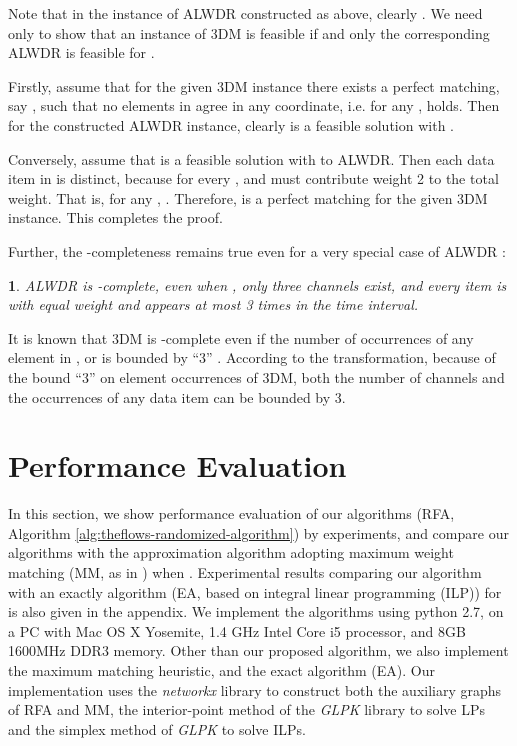 \documentclass[11pt,english,onecolumn,draftcls]{IEEEtran}
\theoremstyle{plain}
\theoremstyle{plain}
\theoremstyle{plain}
\theoremstyle{plain}
\newtheorem{cor}[thm]{\protect\corollaryname}
\providecommand{\corollaryname}{Corollary}
\begin{document}
\begin{IEEEproof}
Note that in the instance of ALWDR constructed as
above, clearly . We need only to show that an instance
of 3DM is feasible if and only the corresponding ALWDR
is feasible for .

Firstly, assume that for the given 3DM instance there exists a perfect
matching, say ,
such that no elements in  agree in any coordinate, i.e. for any
, 
holds. Then for the constructed ALWDR instance,
clearly 
is a feasible solution with .

Conversely, assume that 
is a feasible solution with  to ALWDR.
Then each data item in  is distinct, because for every ,
 and  must contribute weight 2 to the total weight.
That is, for any , .
Therefore, 
is a perfect matching for the given 3DM instance. This completes the
proof.
\end{IEEEproof}
Further, the -completeness remains true even for a very
special case of ALWDR :
\begin{cor}
ALWDR is -complete, even when ,
only three channels exist, and every item is with equal weight and
appears at most 3 times in the time interval.\end{cor}
\begin{IEEEproof}
It is known that 3DM is -complete even if the number of
occurrences of any element in ,  or  is bounded by ``3''
\cite{kann1991maximum}. According to the transformation, because
of the bound ``3'' on element occurrences of 3DM, both the number
of channels and the occurrences of any data item can be bounded by
3.
\end{IEEEproof}

\section{Performance Evaluation}

In this section, we show performance evaluation of our algorithms
(RFA, Algorithm \ref{alg:theflows-randomized-algorithm}) by experiments,
and compare our algorithms with the approximation algorithm adopting
maximum weight matching (MM, as in \cite{Infocom12LuEfficient}) when
. Experimental results comparing our algorithm with an
exactly algorithm (EA, based on integral linear programming (ILP))
for  is also given in the appendix. We implement the algorithms
using python 2.7, on a PC with Mac OS X Yosemite, 1.4 GHz Intel Core
i5 processor, and 8GB 1600MHz DDR3 memory. Other than our proposed
algorithm, we also implement the maximum matching heuristic, and the
exact algorithm (EA). Our implementation uses the \emph{networkx}
library to construct both the auxiliary graphs of RFA and MM, the
interior-point method of the \emph{GLPK} library to solve LPs and
the simplex method of \emph{GLPK }to\emph{ }solve ILPs.
\end{document}
